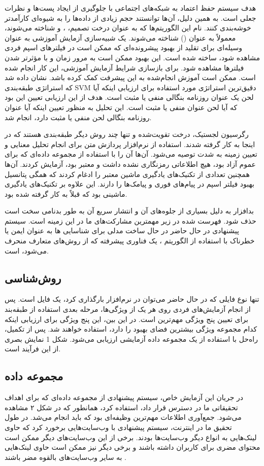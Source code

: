 \documentclass{CSICC2020}
\begin{document}
	هدف سیستم حفظ اعتماد به شبکه‌های اجتماعی با جلوگیری از ایجاد پست‌ها و نظرات جعلی است. به همین دلیل، آن‌ها توانستند حجم زیادی از داده‌ها را به شیوه‌ای کارآمدتر خوشه‌بندی کنند. نام این الگوریتم‌ها که به عنوان درخت تصمیم، ،  و  شناخته می‌شوند، معمولاً به عنوان () شناخته می‌شوند. یک شبیه‌سازی آزمایش آموزشی به عنوان وسیله‌ای برای تقلید از بهبود پیشرونده‌ای که ممکن است در فیلترهای اسپم فردی مشاهده شود، ساخته شده است. این بهبود ممکن است به مرور زمان و با مؤثرتر شدن فیلترها مشاهده شود. برای بازسازی شرایط آزمایش آموزشی، این کار انجام شده است. ممکن است آموزش انجام‌شده به این پیشرفت کمک کرده باشد. نشان داده شد که استراتژی طبقه‌بندی SVM دقیق‌ترین استراتژی مورد استفاده برای ارزیابی اینکه آیا لحن یک عنوان روزنامه بنگالی منفی یا مثبت است. هدف از این ارزیابی تعیین این بود که آیا لحن عنوان منفی یا مثبت است. این تحلیل به منظور تعیین اینکه آیا عنوان روزنامه بنگالی لحن منفی یا مثبت دارد، انجام شد.
	
	رگرسیون لجستیک، درخت تقویت‌شده و  تنها چند روش دیگر طبقه‌بندی هستند که در اینجا به کار گرفته شدند. استفاده از نرم‌افزار پردازش متن برای انجام تحلیل معنایی و تعیین زمینه به شدت توصیه می‌شود. آن‌ها آن را با استفاده از مجموعه داده‌ای که برای عموم آزاد بود، هیچ اطلاعاتی رمزنگاری نشده داشت و معتبر بود، آزمایش کردند. آن‌ها همچنین تعدادی از تکنیک‌های یادگیری ماشین معتبر را ادغام کردند که همگی پتانسیل بهبود فیلتر اسپم در پیام‌های فوری و پیامک‌ها را دارند. این علاوه بر تکنیک‌های یادگیری ماشینی بود که قبلاً به کار گرفته شده بود.
	
	بدافزار به دلیل بسیاری از جلوه‌های آن و انتشار سریع آن به طور بدنامی سخت است حذف شود. فهرست شده در زیر مهمترین مشارکت‌های ما در این زمینه است. سیستم پیشنهادی در حال حاضر در حال ساخت مدلی برای شناسایی ها به عنوان ایمن یا خطرناک با استفاده از الگوریتم ، یک فناوری پیشرفته که از روش‌های متعارف منحرف می‌شود، است.
	
	\subsection{روش‌شناسی}
	تنها نوع فایلی که در حال حاضر می‌توان در نرم‌افزار بارگذاری کرد، یک فایل  است. پس از انجام آزمایش‌های فردی روی هر یک از ویژگی‌ها، مرحله بعدی استفاده از طبقه‌بند  برای تعیین پنج ویژگی مهم‌ترین است. در این بین، این پنج ویژگی برای ارزیابی اینکه کدام مجموعه ویژگی بیشترین فضای بهبود را دارد، استفاده خواهند شد. پس از تکمیل، راه‌حل با استفاده از یک مجموعه داده آزمایشی ارزیابی می‌شود. شکل 1 نمایش بصری از این فرآیند است.
	
	\subsection{مجموعه داده}
	در جریان این آزمایش خاص، سیستم پیشنهادی از مجموعه داده‌ای که  برای اهداف تحقیقاتی ما در دسترس قرار داد، استفاده کرد، همانطور که در شکل ۲ مشاهده می‌شود. جمع‌آوری اطلاعات مهم‌ترین وظیفه‌ای بود که باید انجام می‌شد. در طول تحقیق ما در اینترنت، سیستم پیشنهادی با وب‌سایت‌هایی برخورد کرد که حاوی لینک‌هایی به انواع دیگر وب‌سایت‌ها بودند. برخی از این وب‌سایت‌های دیگر ممکن است محتوای مضری برای کاربران داشته باشند و برخی دیگر نیز ممکن است حاوی لینک‌هایی به سایر وب‌سایت‌های بالقوه مضر باشند \cite{tavallaee2009detailed}.
	
\end{document}
